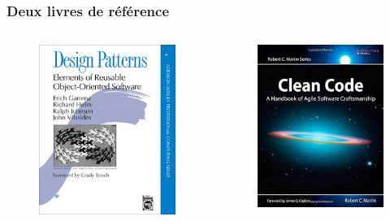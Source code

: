 \begin{frame}
    \frametitle{Deux livres de référence}
    \begin{columns}
        \begin{column}{0.5\textwidth}
            \begin{figure}
                \centering
                \includegraphics[height=\textwidth]{figures/introduction/book-design-patterns}
                \label{fig:book-design-patterns}
            \end{figure}
        \end{column}
        \begin{column}{0.5\textwidth}
            \begin{figure}
                \centering
                \includegraphics[height=\textwidth]{figures/introduction/book-clean-code}

\end{figure}
\end{column}
\end{columns}
\end{frame}
